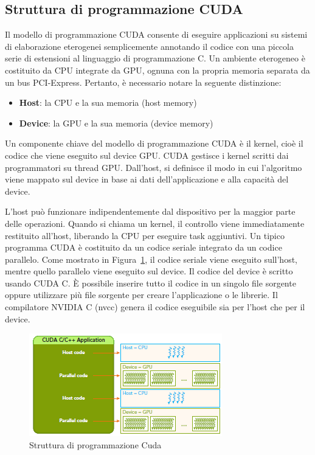 \subsection{Struttura di programmazione CUDA}
Il modello di programmazione CUDA consente di eseguire applicazioni su sistemi di elaborazione eterogenei semplicemente annotando il codice con una piccola serie di estensioni al linguaggio di programmazione C. Un ambiente eterogeneo è costituito da CPU integrate da GPU, ognuna con la propria memoria separata da un bus PCI-Express. Pertanto, è necessario notare la seguente distinzione:
\begin{itemize}
	\item \textbf{Host}: la CPU e la sua memoria (host memory)
	\item \textbf{Device}: la GPU e la sua memoria (device memory)
\end{itemize}
Un componente chiave del modello di programmazione CUDA è il kernel, cioè il codice che viene eseguito sul device GPU. CUDA gestisce i kernel scritti dai programmatori su thread GPU. Dall'host, si definisce il modo in cui l'algoritmo viene mappato sul device in base ai dati dell'applicazione e alla capacità del device. 

L'host può funzionare indipendentemente dal dispositivo per la maggior parte delle operazioni. Quando si chiama un kernel, il controllo viene immediatamente restituito all'host, liberando la CPU per eseguire task aggiuntivi. Un tipico programma CUDA è costituito da un codice seriale integrato da un codice parallelo. Come mostrato in Figura~\ref{fig:Cuda_programming_structure}, il codice seriale viene eseguito sull'host, mentre quello parallelo viene eseguito sul device. Il codice del device è scritto usando CUDA C. È possibile inserire tutto il codice in un singolo file sorgente oppure utilizzare più file sorgente per creare l'applicazione o le librerie. Il compilatore NVIDIA C (nvcc) genera il codice eseguibile sia per l'host che per il device.
\begin{figure}[H]
	\centering
	\includegraphics[width=.7\textwidth]{Immagini/CUDA/Cuda_programming_structure}
	\caption{Struttura di programmazione Cuda \cite{Cheng:ProfessionalCudaProgramming}}
	\label{fig:Cuda_programming_structure}
\end{figure}

